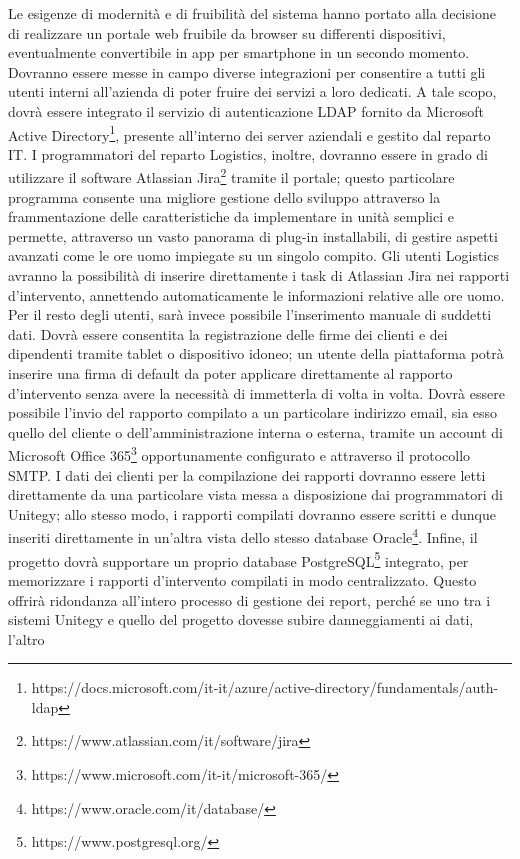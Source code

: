 Le esigenze di modernità e di fruibilità del sistema hanno portato alla decisione di realizzare un portale web fruibile da browser su differenti dispositivi, eventualmente
convertibile in app per smartphone in un secondo momento.
Dovranno essere messe in campo diverse integrazioni per consentire a tutti gli utenti interni all'azienda di poter fruire dei servizi a loro dedicati.
A tale scopo, dovrà essere integrato il servizio di autenticazione LDAP fornito da 
Microsoft Active Directory\footnote{https://docs.microsoft.com/it-it/azure/active-directory/fundamentals/auth-ldap}, presente all'interno dei server aziendali e gestito 
dal reparto IT.
I programmatori del reparto Logistics, inoltre, dovranno essere in grado di utilizzare il software Atlassian Jira\footnote{https://www.atlassian.com/it/software/jira} 
tramite il portale; questo particolare programma consente una migliore gestione dello sviluppo attraverso la frammentazione delle caratteristiche da implementare in unità 
semplici e permette, attraverso un vasto panorama di plug-in installabili, di gestire aspetti avanzati come le ore uomo impiegate su un singolo compito.
Gli utenti Logistics avranno la possibilità di inserire direttamente i task di Atlassian Jira nei rapporti d'intervento, annettendo automaticamente le informazioni relative 
alle ore uomo.
Per il resto degli utenti, sarà invece possibile l'inserimento manuale di suddetti dati.
Dovrà essere consentita la registrazione delle firme dei clienti e dei dipendenti tramite tablet o dispositivo idoneo; un utente della piattaforma potrà inserire una firma di default
da poter applicare direttamente al rapporto d'intervento senza avere la necessità di immetterla di volta in volta.
Dovrà essere possibile l'invio del rapporto compilato a un particolare indirizzo email, sia esso quello del cliente o dell'amministrazione interna o esterna, tramite un account di
Microsoft Office 365\footnote{https://www.microsoft.com/it-it/microsoft-365/} opportunamente configurato e attraverso il protocollo SMTP.
I dati dei clienti per la compilazione dei rapporti dovranno essere letti direttamente da una particolare vista messa a disposizione dai programmatori di Unitegy; allo stesso modo, 
i rapporti compilati dovranno essere scritti e dunque inseriti direttamente in un'altra vista dello stesso database Oracle\footnote{https://www.oracle.com/it/database/}.
Infine, il progetto dovrà supportare un proprio database PostgreSQL\footnote{https://www.postgresql.org/} integrato, per memorizzare i rapporti d'intervento compilati in modo 
centralizzato.
Questo offrirà ridondanza all'intero processo di gestione dei report, perché se uno tra i sistemi Unitegy e quello del progetto dovesse subire danneggiamenti ai dati, l'altro
